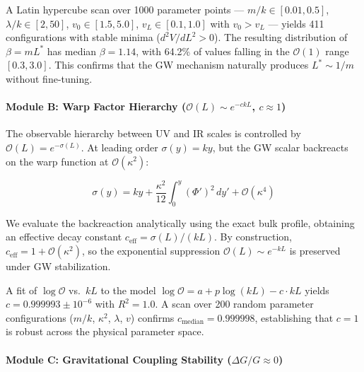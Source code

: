 \documentclass[
  11pt,
]{article}
\begin{document}
A Latin hypercube scan over 1000 parameter points ---
\(m/k \in [0.01, 0.5]\), \(\lambda/k \in [2, 50]\),
\(v_0 \in [1.5, 5.0]\), \(v_L \in [0.1, 1.0]\) with \(v_0 > v_L\) ---
yields 411 configurations with stable minima (\(d^2V/dL^2 > 0\)). The
resulting distribution of \(\beta = mL^*\) has median \(\beta = 1.14\),
with 64.2\% of values falling in the \(\mathcal{O}(1)\) range
\([0.3, 3.0]\). This confirms that the GW mechanism naturally produces
\(L^* \sim 1/m\) without fine-tuning.

\bigskip

\hypertarget{module-b-warp-factor-hierarchy-mathcalol-sim-e-ckl-c-approx-1}{%
\paragraph{\texorpdfstring{Module B: Warp Factor Hierarchy
(\(\mathcal{O}(L) \sim e^{-ckL}\),
\(c \approx 1\))}{Module B: Warp Factor Hierarchy (\textbackslash mathcal\{O\}(L) \textbackslash sim e\^{}\{-ckL\}, c \textbackslash approx 1)}}\label{module-b-warp-factor-hierarchy-mathcalol-sim-e-ckl-c-approx-1}}

The observable hierarchy between UV and IR scales is controlled by
\(\mathcal{O}(L) = e^{-\sigma(L)}\). At leading order
\(\sigma(y) = ky\), but the GW scalar backreacts on the warp function at
\(\mathcal{O}(\kappa^2)\):

\[\sigma(y) = ky + \frac{\kappa^2}{12}\int_0^y (\Phi')^2\,dy' + \mathcal{O}(\kappa^4) \tag{143}\]

We evaluate the backreaction analytically using the exact bulk profile,
obtaining an effective decay constant \(c_\text{eff} = \sigma(L)/(kL)\).
By construction, \(c_\text{eff} = 1 + \mathcal{O}(\kappa^2)\), so the
exponential suppression \(\mathcal{O}(L) \sim e^{-kL}\) is preserved
under GW stabilization.

A fit of \(\log\mathcal{O}\) vs.~\(kL\) to the model
\(\log\mathcal{O} = a + p\log(kL) - c\cdot kL\) yields
\(c = 0.999993 \pm 10^{-6}\) with \(R^2 = 1.0\). A scan over 200 random
parameter configurations (\(m/k\), \(\kappa^2\), \(\lambda\), \(v\))
confirms \(c_\text{median} = 0.999998\), establishing that \(c = 1\) is
robust across the physical parameter space.

\bigskip

\hypertarget{module-c-gravitational-coupling-stability-delta-gg-approx-0}{%
\paragraph{\texorpdfstring{Module C: Gravitational Coupling Stability
(\(\Delta G/G \approx 0\))}{Module C: Gravitational Coupling Stability (\textbackslash Delta G/G \textbackslash approx 0)}}\label{module-c-gravitational-coupling-stability-delta-gg-approx-0}}
\end{document}
